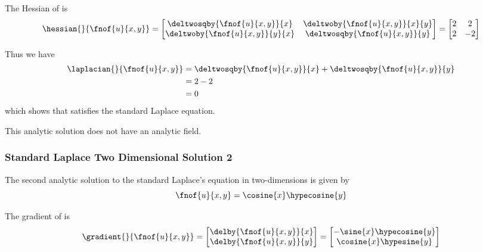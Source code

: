 The Hessian of  is
\begin{equation}
  \hessian{}{\fnof{u}{x,y}}=\begin{bmatrix}
  \deltwosqby{\fnof{u}{x,y}}{x} & \deltwoby{\fnof{u}{x,y}}{x}{y} \\
  \deltwoby{\fnof{u}{x,y}}{y}{x} & \deltwosqby{\fnof{u}{x,y}}{y}
  \end{bmatrix}=\begin{bmatrix}
  2 & 2 \\
  2 & -2
  \end{bmatrix}
  \label{eqn:StandardLaplaceTwoDAnalyticHessian1}
\end{equation}

Thus we have
\begin{equation}
  \begin{aligned}
    \laplacian{}{\fnof{u}{x,y}}&=\deltwosqby{\fnof{u}{x,y}}{x}+\deltwosqby{\fnof{u}{x,y}}{y}\\
    &=2-2\\
    &=0
  \end{aligned}
\end{equation}
which shows that  satisfies the standard Laplace equation.

This analytic solution does not have an analytic field.

\subsubsection{Standard Laplace Two Dimensional Solution 2}
 
The second analytic solution to the standard Laplace's equation in two-dimensions is given by
\begin{equation}
  \fnof{u}{x,y}=\cosine{x}\hypecosine{y}
  \label{eqn:StandardLaplaceTwoDAnalytic2}
\end{equation}

The gradient of  is
\begin{equation}
  \gradient{}{\fnof{u}{x,y}}=\begin{bmatrix}
  \delby{\fnof{u}{x,y}}{x} \\
  \delby{\fnof{u}{x,y}}{y}
  \end{bmatrix}=\begin{bmatrix}
  -\sine{x}\hypecosine{y} \\
  \cosine{x}\hypesine{y}
  \end{bmatrix}
  \label{eqn:StandardLaplaceTwoDAnalyticGradient2}
\end{equation}

